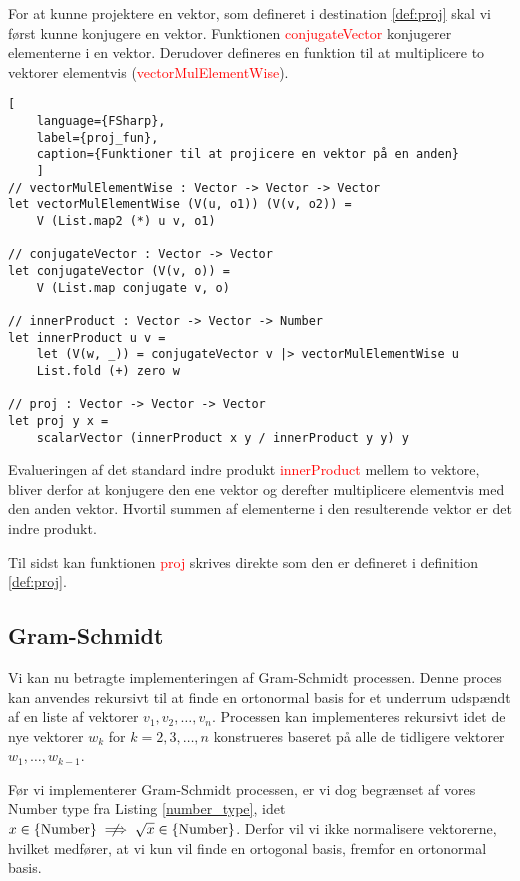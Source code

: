 For at kunne projektere en vektor, som defineret i destination \ref{def:proj} skal vi først kunne konjugere en vektor. Funktionen \textcolor{red}{conjugateVector} konjugerer elementerne i en vektor. Derudover defineres en funktion til at multiplicere to vektorer elementvis (\textcolor{red}{vectorMulElementWise}).

\begin{lstlisting}[
    language={FSharp}, 
    label={proj_fun}, 
    caption={Funktioner til at projicere en vektor på en anden}
    ]
// vectorMulElementWise : Vector -> Vector -> Vector
let vectorMulElementWise (V(u, o1)) (V(v, o2)) =
    V (List.map2 (*) u v, o1)

// conjugateVector : Vector -> Vector
let conjugateVector (V(v, o)) = 
    V (List.map conjugate v, o)

// innerProduct : Vector -> Vector -> Number
let innerProduct u v =
    let (V(w, _)) = conjugateVector v |> vectorMulElementWise u
    List.fold (+) zero w

// proj : Vector -> Vector -> Vector   
let proj y x =
    scalarVector (innerProduct x y / innerProduct y y) y
\end{lstlisting}

Evalueringen af det standard indre produkt \textcolor{red}{innerProduct} mellem to vektore, bliver derfor at konjugere den ene vektor og derefter multiplicere elementvis med den anden vektor. Hvortil summen af elementerne i den resulterende vektor er det indre produkt.

Til sidst kan funktionen \textcolor{red}{proj} skrives direkte som den er defineret i definition \ref{def:proj}.



\subsection{Gram-Schmidt}\label{sec:gram_schmidt}
Vi kan nu betragte implementeringen af Gram-Schmidt processen. Denne proces kan anvendes rekursivt til at finde en ortonormal basis for et underrum udspændt af en liste af vektorer $v_1, v_2, \ldots, v_n$. Processen kan implementeres rekursivt idet de nye vektorer $w_k$ for $k = 2, 3, \ldots, n$ konstrueres baseret på alle de tidligere vektorer $w_1, \ldots, w_{k-1}$. 

Før vi implementerer Gram-Schmidt processen, er vi dog begrænset af vores Number type fra Listing \ref{number_type}, idet $x \in \text{\{Number\}} \centernot\implies \sqrt{x} \in \text{\{Number\}}$. Derfor vil vi ikke normalisere vektorerne, hvilket medfører, at vi kun vil finde en ortogonal basis, fremfor en ortonormal basis.

